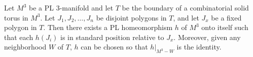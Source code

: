 Let $M^3$ be a PL 3-manifold and let $T$ be the boundary of a combinatorial solid torus in $M^3$. Let $J_1, J_2, \dots, J_n$ be disjoint polygons in $T$, and let $J_x$ be a fixed polygon in $T$. Then there exists a PL homeomorphism $h$ of $M^3$ onto itself such that each $h(J_i)$ is in standard position relative to $J_x$. Moreover, given any neighborhood $W$ of $T$, $h$ can be chosen so that $h|_{M^3 - W}$ is the identity.

